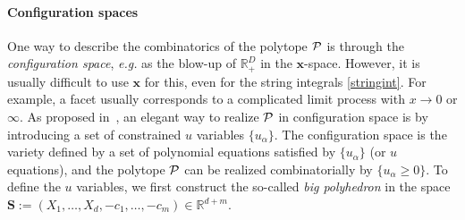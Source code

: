 \documentclass[hidelinks,12pt]{article}
\begin{document}
\paragraph{Configuration spaces} One way to describe the combinatorics of the polytope ${\cal P}$ is through the {\it configuration space}, {\it e.g.} as the blow-up of $\mathbb R_+^D$ in the $\mathbf x$-space. However, it is usually difficult to use $\mathbf x$ for this, even for the string integrals \eqref{stringint}. For example, a facet usually corresponds to a complicated limit process with $x \to 0$ or $\infty$. As proposed in~\cite{Arkani-Hamed:2019plo}, an elegant way to realize ${\cal P}$ in configuration space is by introducing a set of constrained $u$ variables $\{u_\alpha\}$. The configuration space is the variety defined by a set of polynomial equations satisfied by $\{u_\alpha\}$ (or $u$ equations), and the polytope ${\cal P}$ can be realized combinatorially by $\{u_\alpha \geq 0\}$. 
To define the $u$ variables, we first construct the so-called \textit{big polyhedron} in the space $\mathbf S:=(X_1,\dots,X_d,-c_1,\dots,-c_m) \in \mathbb R^{d{+}m}$.  %
\end{document}
